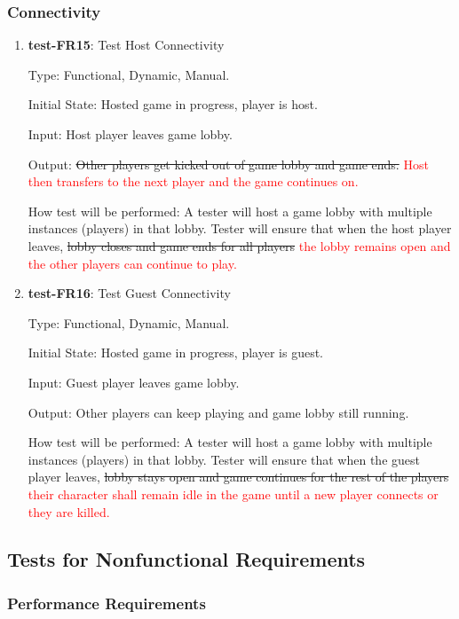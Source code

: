\documentclass[12pt, titlepage]{article}
\begin{document}
\subsubsection{Connectivity}

\begin{enumerate}

\item{\textbf{test-FR15}: Test Host Connectivity\\}

Type: Functional, Dynamic, Manual.
					
Initial State: Hosted game in progress, player is host.
					
Input: Host player leaves game lobby.
					
Output: \st{Other players get kicked out of game lobby and game ends.} \textcolor{red}{Host then transfers to the next player and the game continues on.} 
					
How test will be performed: A tester will host a game lobby with multiple instances (players) in that lobby. Tester will ensure that when the host player leaves, \st{lobby closes and game ends for all players} \textcolor{red}{the lobby remains open and the other players can continue to play.}

\item{\textbf{test-FR16}: Test Guest Connectivity\\}

Type: Functional, Dynamic, Manual.
					
Initial State: Hosted game in progress, player is guest.
					
Input: Guest player leaves game lobby.
					
Output: Other players can keep playing and game lobby still running.
					
How test will be performed: A tester will host a game lobby with multiple instances (players) in that lobby. Tester will ensure that when the guest player leaves, \st{lobby stays open and game continues for the rest of the players} \textcolor{red}{their character shall remain idle in the game until a new player connects or they are killed.}

\end{enumerate}


\subsection{Tests for Nonfunctional Requirements}

\subsubsection{Performance Requirements}
\end{document}
